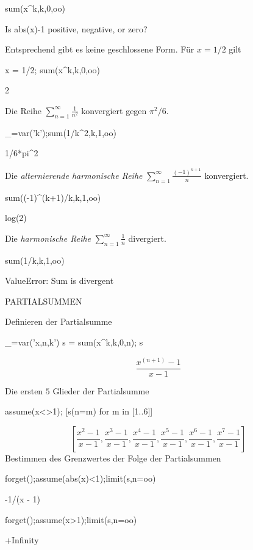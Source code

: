 \documentclass[fontsize=12pt,paper=a4,twoside,bibtotoc,idxtotoc,
liststotoc,pagesize,BCOR1.2cm,DIV15,chapterprefix,pagesize=pdftex]{scrbook}
\theoremstyle{plain}
\theoremstyle{definition}
\theoremstyle{remark}
\begin{document}
\begin{sagein}
sum(x^k,k,0,oo)
\end{sagein}
\begin{sage}
Is  abs(x)-1  positive, negative, or zero?
\end{sage}
Entsprechend gibt es keine geschlossene Form. Für $x=1/2$ gilt
\begin{sagein}
x = 1/2; sum(x^k,k,0,oo)
\end{sagein}
\begin{sage}
  2
\end{sage}
 Die Reihe $\sum_{n=1}^\infty \frac{1}{n^2}$ konvergiert gegen
$\pi^2/6$.
\begin{sagein}
_=var('k');sum(1/k^2,k,1,oo)
\end{sagein}
\begin{sage}
1/6*pi^2
\end{sage}
 Die \emph{alternierende harmonische Reihe}  $\sum_{n=1}^\infty
\frac{(-1)^{n+1}}{n}$ konvergiert.
\begin{sagein}
sum((-1)^(k+1)/k,k,1,oo)
\end{sagein}
\begin{sage}
  log(2)
\end{sage}
 Die \emph{harmonische Reihe} $\sum_{n=1}^\infty \frac{1}{n}$
 divergiert.
\begin{sagein}
sum(1/k,k,1,oo)
\end{sagein}
\begin{sage}
ValueError: Sum is divergent
\end{sage}


PARTIALSUMMEN


 Definieren der Partialsumme
\begin{sagein}
_=var('x,n,k')
s = sum(x^k,k,0,n); s
\end{sagein}
{\color{blue}\[\frac{x^{{\left(n + 1\right)}} - 1}{x - 1}\]}

 Die ersten $5$ Glieder der Partialsumme
\begin{sagein}
assume(x<>1); [s(n=m) for m in [1..6]]
\end{sagein}
{\color{blue}\[\left[\frac{x^{2} - 1}{x - 1}, \frac{x^{3} - 1}{x - 1}, \frac{x^{4} - 1}{x - 1}, \frac{x^{5} - 1}{x - 1}, \frac{x^{6} - 1}{x - 1}, \frac{x^{7} - 1}{x - 1}\right] \]}
 Bestimmen des Grenzwertes der Folge der Partialsummen
\begin{sagein}
forget();assume(abs(x)<1);limit(s,n=oo)
\end{sagein}
\begin{sage}
-1/(x - 1)
\end{sage}
\begin{sagein}
forget();assume(x>1);limit(s,n=oo)
\end{sagein}
\begin{sage}
+Infinity
\end{sage}
 
\end{document}
